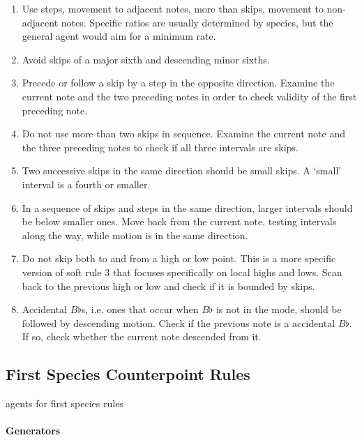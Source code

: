 	\begin{enumerate}
		\item Use steps, movement to adjacent notes, more than skips, movement to non-adjacent notes. Specific ratios are usually determined by species, but the general agent would aim for a minimum rate.
		
		\item Avoid skips of a major sixth and descending minor sixths.

		\item Precede or follow a skip by a step in the opposite direction. Examine the current note and the two preceding notes in order to check validity of the first preceding note.

		\item Do not use more than two skips in sequence. Examine the current note and the three preceding notes to check if all three intervals are skips.

		\item Two successive skips in the same direction should be small skips. A `small' interval is a fourth or smaller.

		\item In a sequence of skips and steps in the same direction, larger intervals should be below smaller ones.
					Move back from the current note, testing intervals along the way, while motion is in the same direction.

		\item Do not skip both to and from a high or low point. This is a more specific version of soft rule 3 that focuses specifically on local highs and lows.
					Scan back to the previous high or low and check if it is bounded by skips.

		\item Accidental $B\flat$s, i.e. ones that occur when $B\flat$ is not in the mode, should be followed by descending motion.
					Check if the previous note is a accidental $B\flat$. If so, check whether the current note descended from it.

	\end{enumerate}

\subsection{First Species Counterpoint Rules}

agents for first species rules

\paragraph{Generators}
